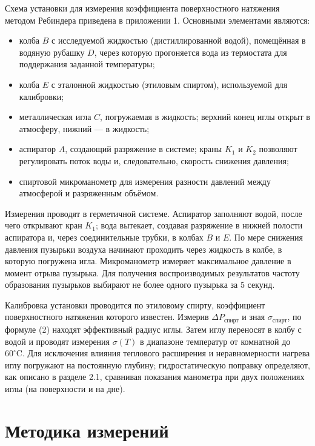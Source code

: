 \documentclass[a4paper]{article}
\begin{document}
	Схема установки для измерения коэффициента поверхностного натяжения методом Ребиндера приведена в приложении 1. Основными элементами являются:
	\begin{itemize}
		\item колба \(B\) с исследуемой жидкостью (дистиллированной водой), помещённая в водяную рубашку \(D\), через которую прогоняется вода из термостата для поддержания заданной температуры;
		\item колба \(E\) с эталонной жидкостью (этиловым спиртом), используемой для калибровки;
		\item металлическая игла \(C\), погружаемая в жидкость; верхний конец иглы открыт в атмосферу, нижний — в жидкость;
		\item аспиратор \(A\), создающий разряжение в системе; краны \(K_1\) и \(K_2\) позволяют регулировать поток воды и, следовательно, скорость снижения давления;
		\item спиртовой микроманометр для измерения разности давлений между атмосферой и разряженным объёмом.
	\end{itemize}
	
	
	Измерения проводят в герметичной системе. Аспиратор заполняют водой, после чего открывают кран \(K_1\); вода вытекает, создавая разряжение в нижней полости аспиратора и, через соединительные трубки, в колбах \(B\) и \(E\). По мере снижения давления пузырьки воздуха начинают проходить через жидкость в колбе, в которую погружена игла. Микроманометр измеряет максимальное давление в момент отрыва пузырька. Для получения воспроизводимых результатов частоту образования пузырьков выбирают не более одного пузырька за 5 секунд.
	
	Калибровка установки проводится по этиловому спирту, коэффициент поверхностного натяжения которого известен. Измерив \(\Delta P_{\text{спирт}}\) и зная \(\sigma_{\text{спирт}}\), по формуле (2) находят эффективный радиус иглы. Затем иглу переносят в колбу с водой и проводят измерения \(\sigma(T)\) в диапазоне температур от комнатной до \(60^{\circ}\text{C}\). Для исключения влияния теплового расширения и неравномерности нагрева иглу погружают на постоянную глубину; гидростатическую поправку определяют, как описано в разделе 2.1, сравнивая показания манометра при двух положениях иглы (на поверхности и на дне).
	\section{Методика измерений}
	
\end{document}
